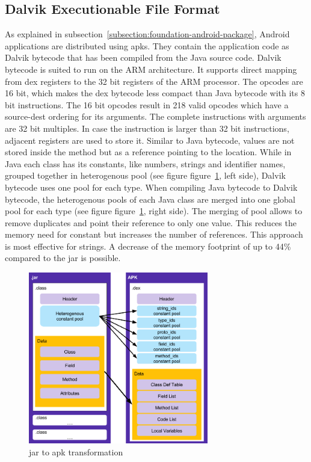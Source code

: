 \subsection{Dalvik Executionable File Format} \label{subsection:android-dex}
As explained in subsection~\ref{subsection:foundation-android-package}, Android applications are distributed using \gls{apk}s.
They contain the application code as Dalvik bytecode that has been compiled from the Java source code.
\newline
Dalvik bytecode is suited to run on the ARM architecture.
It supports direct mapping from dex registers to the 32 bit registers of the ARM processor.
The opcodes are 16 bit, which makes the dex bytecode less compact than Java bytecode with its 8 bit instructions.
The 16 bit opcodes result in 218 valid opcodes which have a source-dest ordering for its arguments.
The complete instructions with arguments are 32 bit multiples.
In case the instruction is larger than 32 bit instructions, adjacent registers are used to store it. \cite{androidDalvik}
\newline
Similar to Java bytecode, values are not stored inside the method but as a reference pointing to the location.
While in Java each class has its constants, like numbers, strings and identifier names, grouped together in heterogenous pool (see figure figure~\ref{fig:java}, left side), Dalvik bytecode uses one pool for each type.
When compiling Java bytecode to Dalvik bytecode, the heterogenous pools of each Java class are merged into one global pool for each type (see figure figure~\ref{fig:java}, right side).
The merging of pool allows to remove duplicates and point their reference to only one value.
This reduces the memory need for constant but increases the number of references.
This approach is most effective for strings.
A decrease of the memory footprint of up to 44\% compared to the \gls{jar} is possible.
\newline
\begin{figure}[h]
    \centering
    \includegraphics[width=0.7\textwidth]{data/java.png}
    \caption{\gls{jar} to \gls{apk} transformation \cite{googleDalvik}}
    \label{fig:java}
\end{figure}
